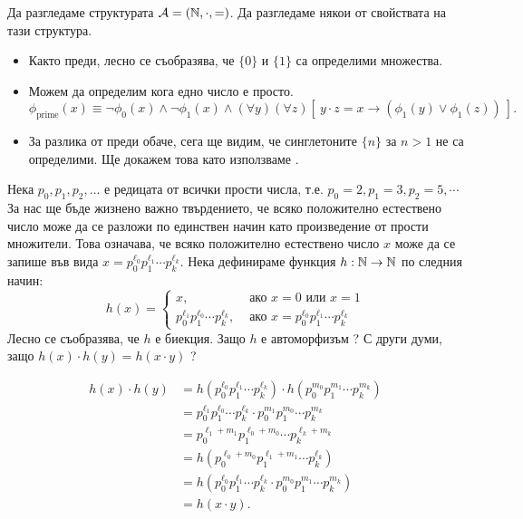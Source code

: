 \begin{example}
  Да разгледаме структурата $\mathcal{A} = (\mathbb{N}, \cdot ,=)$. Да разгледаме някои от свойствата на тази структура.
  \begin{itemize}
  \item 
    Както преди, лесно се съобразява, че $\{0\}$ и $\{1\}$ са определими множества.
  \item
    Можем да определим кога едно число е просто.
    \[\phi_{\text{prime}}(x) \equiv \neg \phi_0(x) \land \neg \phi_1(x) \land (\forall y)(\forall z)[\ y \cdot z = x \to (\phi_1(y) \lor \phi_1(z))\ ].\]
  \item
    За разлика от преди обаче, сега ще видим, че синглетоните $\{n\}$ за $n > 1$ не са определими.
    Ще докажем това като използваме .
  \end{itemize}
  
  

  Нека $p_0,p_1,p_2,\dots$ е редицата от всички прости числа, т.е. $p_0 = 2, p_1 = 3, p_2 = 5, \cdots$
  За нас ще бъде жизнено важно твърдението, че всяко положително естествено число може да се разложи по единствен начин
  като произведение от прости множители. Това означава, че всяко положително естествено число $x$ може да се запише във вида
  $x = p^{\ell_0}_0p^{\ell_1}_1\cdots p^{\ell_k}_k$.
  Нека дефинираме функция $h:\mathbb{N} \to \mathbb{N}$ по следния начин:
  \[h(x) =
    \begin{cases}
      x, & \text{ ако }x = 0 \text{ или } x = 1\\
      p^{\ell_1}_0p^{\ell_0}_1\cdots p^{\ell_k}_k, & \text{ ако }x = p^{\ell_0}_0 p^{\ell_1}_1 \cdots p^{\ell_k}_k
    \end{cases}\]
  Лесно се съобразява, че $h$ е биекция. Защо $h$ е автоморфизъм ?
  С други думи, защо $h(x) \cdot h(y) = h(x \cdot y)$ ?
  
  \begin{align*}
    h(x) \cdot h(y) & = h(p^{\ell_0}_0 p^{\ell_1}_1\cdots p^{\ell_k}_k) \cdot h(p^{m_0}_0 p^{m_1}_1\cdots p^{m_k}_k)\\
                    & = p^{\ell_1}_0 p^{\ell_0}_1\cdots p^{\ell_k}_k \cdot p^{m_1}_0 p^{m_0}_1\cdots p^{m_k}_k\\
                    & = p^{\ell_1+m_1}_0 p^{\ell_0+m_0}_1\cdots p^{\ell_k+m_k}_k\\
                    & = h(p^{\ell_0+m_0}_0 p^{\ell_1+m_1}_1\cdots p^{\ell_k}_k)\\
                    & = h(p^{\ell_0}_0 p^{\ell_1}_1\cdots p^{\ell_k}_k \cdot p^{m_0}_0 p^{m_1}_1\cdots p^{m_k}_k)\\
                    & = h(x \cdot y).
  \end{align*}


\end{example}

